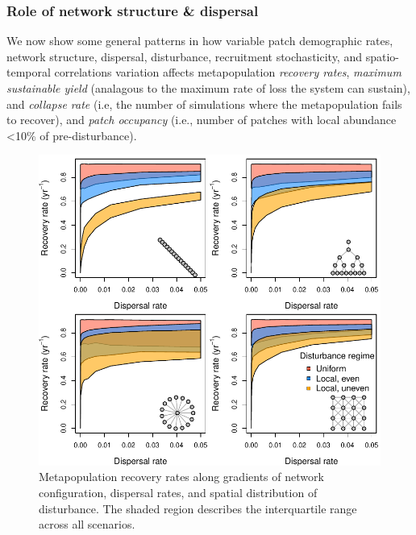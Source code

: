 \documentclass[
]{article}
\begin{document}
\hypertarget{role-of-network-structure-dispersal}{%
\subsubsection{Role of network structure \&
dispersal}\label{role-of-network-structure-dispersal}}

We now show some general patterns in how variable patch demographic
rates, network structure, dispersal, disturbance, recruitment
stochasticity, and spatio-temporal correlations variation affects
metapopulation \emph{recovery rates}, \emph{maximum sustainable yield}
(analagous to the maximum rate of loss the system can sustain), and
\emph{collapse rate} (i.e, the number of simulations where the
metapopulation fails to recover), and \emph{patch occupancy} (i.e.,
number of patches with local abundance \textless10\% of
pre-disturbance).

\begin{figure}[H]

{\centering \includegraphics{Managing_for_ecological_surprises_in_metapopulations_files/figure-latex/recovery and dispersal and spatial network-1} 

}

\caption{Metapopulation recovery rates along gradients of network configuration, dispersal rates, and spatial distribution of disturbance. The shaded region describes the interquartile range across all scenarios.}\label{fig:recovery and dispersal and spatial network}
\end{figure}
\end{document}
